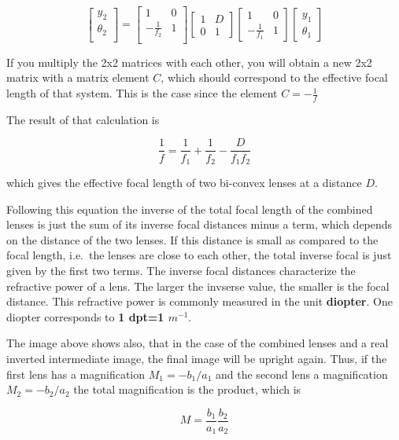 \documentclass[
  a4paper,
]{book}
\begin{document}
\[\begin{bmatrix}
y_2\\
\theta_2\\
\end{bmatrix}
=
\begin{bmatrix}
1 & 0\\
-\frac{1}{f_2} & 1 \\
\end{bmatrix}
\begin{bmatrix}
1 & D\\
0 & 1
\end{bmatrix}
\begin{bmatrix}
1 & 0\\
-\frac{1}{f_1} & 1
\end{bmatrix}
\begin{bmatrix}
y_1\\
\theta_1
\end{bmatrix}\]

If you multiply the 2x2 matrices with each other, you will obtain a new
2x2 matrix with a matrix element \(C\), which should correspond to the
effective focal length of that system. This is the case since the
element \(C=-\frac{1}{f}\)

The result of that calculation is

\[\frac{1}{f}=\frac{1}{f_1}+\frac{1}{f_2}-\frac{D}{f_1 f_2}\]

which gives the effective focal length of two bi-convex lenses at a
distance \(D\).

Following this equation the inverse of the total focal length of the
combined lenses is just the sum of its inverse focal distances minus a
term, which depends on the distance of the two lenses. If this distance
is small as compared to the focal length, i.e.~the lenses are close to
each other, the total inverse focal is just given by the first two
terms. The inverse focal distances characterize the refractive power of
a lens. The larger the invserse value, the smaller is the focal
distance. This refractive power is commonly measured in the unit
\textbf{diopter}. One diopter corresponds to \textbf{1 dpt=1
\(m^{-1}\)}.

The image above shows also, that in the case of the combined lenses and
a real inverted intermediate image, the final image will be upright
again. Thus, if the first lens has a magnification \(M_1=-b_1/a_1\) and
the second lens a magnification \(M_2=-b_2/a_2\) the total magnification
is the product, which is

\[M=\frac{b_1}{a_1}\frac{b_2}{a_2}\]
\end{document}
